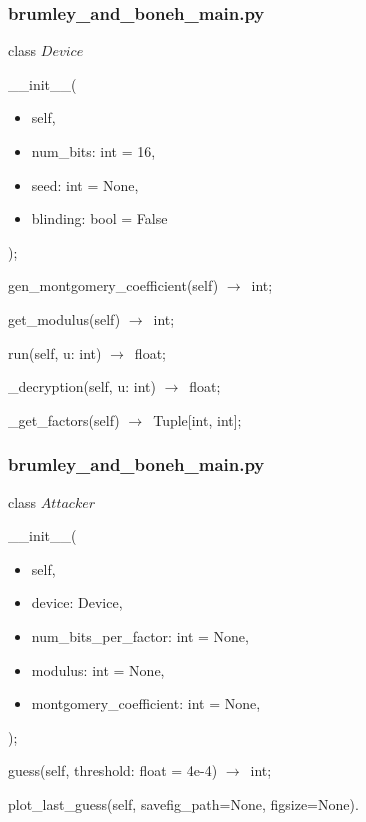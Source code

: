 \documentclass{beamer}
\begin{document}
\begin{frame}
\frametitle{brumley\_and\_boneh\_main.py}

\begin{itemize}
  \item class $Device$
  \begin{itemize}
    {
      \item \_\_init\_\_(
      \begin{itemize}
        \item[] self,
        \item[] num\_bits: int = 16,
        \item[] seed: int = None,
        \item[] blinding: bool = False
      \end{itemize}
      \item[] );
    }
    {
      \item gen\_montgomery\_coefficient(self) $\rightarrow$\ int;
    }
    {
      \item get\_modulus(self) $\rightarrow$\ int;
    }
    {
      \item run(self, u: int) $\rightarrow$\ float;
    }
    {
      \item \_decryption(self, u: int) $\rightarrow$\ float;
    }
    {
      \item \_get\_factors(self) $\rightarrow$\ Tuple[int, int];
    }
  \end{itemize}
\end{itemize}

\end{frame}
\begin{frame}
\frametitle{brumley\_and\_boneh\_main.py}

\begin{itemize}
  \item class $Attacker$
  \begin{itemize}
    {
      \item \_\_init\_\_(
      \begin{itemize}
        \item[] self,
        \item[] device: Device,
        \item[] num\_bits\_per\_factor: int = None,
        \item[] modulus: int = None,
        \item[] montgomery\_coefficient: int = None,
      \end{itemize}
      \item[] );
    }
    {
      \item guess(self, threshold: float = 4e-4) $\rightarrow$\ int;
    }
    {
      \item plot\_last\_guess(self, savefig\_path=None, figsize=None).
    }
  \end{itemize}
\end{itemize}

\end{frame}
\end{document}
